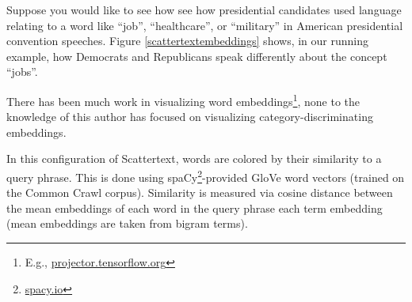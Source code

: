 \documentclass[11pt,a4paper]{article}
\begin{document}
Suppose you would like to see how see how presidential candidates used language relating to a word like ``job'', ``healthcare'', or ``military'' in American presidential convention speeches.   Figure \ref{scattertextembeddings} shows, in our running example, how Democrats and Republicans speak differently about the concept ``jobs''.  

There has been much work in visualizing word embeddings\footnote{E.g., \href{http://projector.tensorflow.org/}{projector.tensorflow.org}}, none to the knowledge of this author has focused on visualizing category-discriminating embeddings.

In this configuration of Scattertext, words are colored by their similarity to a query phrase.  This is done using spaCy\footnote{\href{https://spacy.io/}{spacy.io}}-provided GloVe \cite{glove} word vectors (trained on the Common Crawl corpus).  Similarity is measured via cosine distance between the mean embeddings of each word in the query phrase each term embedding (mean embeddings are taken from bigram terms).  
\end{document}
